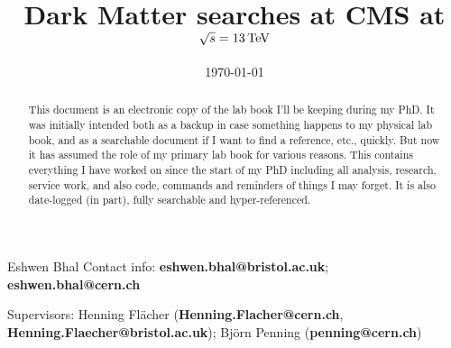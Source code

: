 \documentclass[12pt, dvipsnames, svgnames]{cmspaper} %
\renewcommand{\lstlistoflistings}{\listoflistings}
\renewcommand{\_}{\texttt{\char`_}}
\newcommand{\comruntwo}{\ensuremath{\sqrt{s} = 13 \TeV}\xspace}
\begin{document}
\begin{titlepage}

   \date{\today}

  \title{Dark Matter searches at CMS at \comruntwo}

  \begin{Authlist}
    Eshwen Bhal
       Contact info: \textbf{eshwen.bhal@bristol.ac.uk}; \textbf{eshwen.bhal@cern.ch}
       
       Supervisors: Henning Fl\"{a}cher (\textbf{Henning.Flacher@cern.ch}, \textbf{Henning.Flaecher@bristol.ac.uk}); Bj\"{o}rn Penning (\textbf{penning@cern.ch})
  \end{Authlist}

  \begin{abstract}
This document is an electronic copy of the lab book I'll be keeping during my PhD. It was initially intended both as a backup in case something happens to my physical lab book, and as a searchable document if I want to find a reference, etc., quickly. But now it has assumed the role of my primary lab book for various reasons. This contains everything I have worked on since the start of my PhD including all analysis, research, service work, and also code, commands and reminders of things I may forget. It is also date-logged (in part), fully searchable and hyper-referenced.
  \end{abstract} 
  
\end{titlepage}

\tableofcontents %
\listoffigures %
\listoftables %
\lstlistoflistings %

\newpage
{} %

\end{document}
